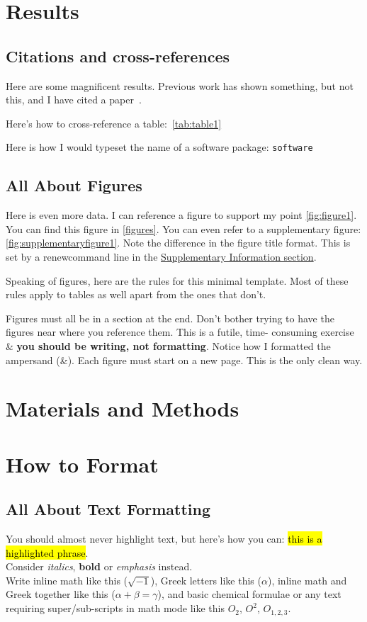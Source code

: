 \documentclass{getwriting}
\begin{document}
\section{Results}\label{results}
\subsection{Citations and cross-references}
Here are some magnificent results. Previous work has shown something, but not this, and I have cited a paper~\cite{scbonita}. 
\par
Here's how to cross-reference a table:~\hyperref[tab:table1]{\autoref{tab:table1}}
\par
Here is how I would typeset the name of a software package: \lstinline{software}
\subsection{All About Figures}
Here is even more data. I can reference a figure to support my point \hyperref[fig:figure1]{\autoref{fig:figure1}}.
You can find this figure in \hyperref[figures]{\autoref{figures}}. You can even refer to a supplementary figure: \hyperref[fig:supplementaryfigure1]{\autoref{fig:supplementaryfigure1}}. Note the difference in the figure title format. This is set by a renewcommand line in the \hyperref[suppinfo]{Supplementary Information section}.
\par
Speaking of figures, here are the rules for this minimal template. Most of these rules apply to tables as well apart from the ones that don't.
\begin{outline}
    \1 Figures must all be in a section at the end. Don't bother trying to have the figures near where you reference them. This is a futile, time- consuming exercise \& \textbf{you should be writing, not formatting}. Notice how I formatted the ampersand (\&).
    \1 Each figure must start on a new page. This is the only clean way.
\end{outline}

\section{Materials and Methods}
\section{How to Format}
\subsection{All About Text Formatting}
You should almost never highlight text, but here's how you can: \hl{this is a highlighted phrase}.\\
Consider \textit{italics}, \textbf{bold} or \emph{emphasis} instead.\\
Write inline math like this ($\sqrt{-1}$), Greek letters like this ($\alpha$), inline math and Greek together like this ($\alpha + \beta = \gamma$), and basic chemical formulae or any text requiring super/sub-scripts in math mode like this $O_2$, $O^2$, $O_{1,2,3}$. 
\end{document}
